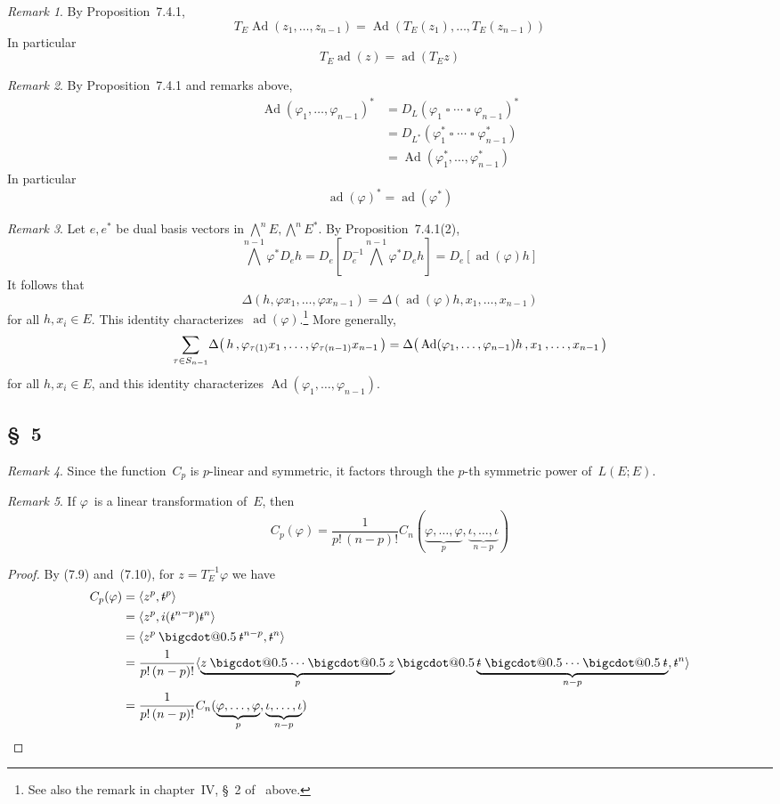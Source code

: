\documentclass[letterpaper,12pt]{article}
\makeatletter
\DeclareMathOperator{\ad}{ad}
\DeclareMathOperator{\Ad}{Ad}
\newcommand{\bigcdot}[1]{\mathbin{\mathpalette\bigcdot@{#1}}}
\newcommand{\bigcdot@}[2]{%
  \sbox0{$#1\vcenter{}$}%
  \sbox2{$#1\cdot\m@th$}%
  \hbox{%
    \hfil
    \raise\ht0\hbox{%
      \scalebox{#2}{%
        \lower\ht0\hbox{$#1\bullet\m@th$}%
      }%
    }%
    \hfil
  }%
}
\newcommand{\bigeprod}{\bigwedge}
\newcommand{\medeprod}{{\textstyle\bigeprod}}
\newcommand{\mprod}{\bigcdot{0.5}}
\newcommand{\bprod}{\mathbin{\square}}
\newcommand{\sprod}[2]{\langle#1,#2\rangle}
\newcommand{\multi}[4]{#2_{#3}#1\cdots#1#2_{#4}}
\newcommand{\mprods}[3]{\multi{\mprod}{#1}{#2}{#3}}
\newcommand{\bprods}[3]{\multi{\bprod}{#1}{#2}{#3}}
\newcommand{\stroked}[1]{\mathrlap{\text{\kern0.05em-}}#1}
\newcommand{\unit}{\stroked{t}}
\theoremstyle{definition}
\theoremstyle{remark}
\newtheorem*{rmk}{Remark}
\makeatother
\begin{document}
\begin{rmk}
By Proposition~7.4.1,
\[T_E\Ad(z_1,\ldots,z_{n-1})=\Ad(T_E(z_1),\ldots,T_E(z_{n-1}))\]
In particular
\[T_E\ad(z)=\ad(T_Ez)\]
\end{rmk}

\begin{rmk}
By Proposition~7.4.1 and remarks above,
\begin{align*}
\Ad(\varphi_1,\ldots,\varphi_{n-1})^*&=D_L(\bprods{\varphi}{1}{n-1})^*\\
	&=D_{L^*}(\bprods{\varphi^*}{1}{n-1})\\
	&=\Ad(\varphi_1^*,\ldots,\varphi_{n-1}^*)
\end{align*}
In particular
\[\ad(\varphi)^*=\ad(\varphi^*)\]
\end{rmk}

\begin{rmk}
Let \(e,e^*\) be dual basis vectors in \(\medeprod^n E,\medeprod^n E^*\). By Proposition~7.4.1(2),
\[\medeprod^{n-1}\varphi^*D_eh=D_e[D_e^{-1}\medeprod^{n-1}\varphi^*D_eh]=D_e[\ad(\varphi)h]\]
It follows that
\[\Delta(h,\varphi x_1,\ldots,\varphi x_{n-1})=\Delta(\ad(\varphi)h,x_1,\ldots,x_{n-1})\]
for all \(h,x_i\in E\). This identity characterizes~\(\ad(\varphi)\).\footnote{See also the remark in chapter~IV, \S~2 of~\cite{greub1} above.} More generally,
\[\sum_{\tau\in S_{n-1}}\!\Delta\bigl(\,h\,,\varphi_{\tau(1)}x_1\,,\ldots,\varphi_{\tau(n-1)}x_{n-1}\,\bigr)\\=\Delta\bigl(\,\Ad(\varphi_1,\ldots,\varphi_{n-1})h\,,x_1\,,\ldots,x_{n-1}\,\bigr)\]
for all \(h,x_i\in E\), and this identity characterizes \(\Ad(\varphi_1,\ldots,\varphi_{n-1})\).
\end{rmk}

\subsection*{\S~5}
\begin{rmk}
Since the function~\(C_p\) is \(p\)-linear and symmetric, it factors through the \(p\)-th symmetric power of~\(L(E;E)\).
\end{rmk}

\begin{rmk}
If \(\varphi\)~is a linear transformation of~\(E\), then
\[C_p(\varphi)=\frac{1}{p!\,(n-p)!}C_n(\underbrace{\varphi,\ldots,\varphi}_p,\underbrace{\iota,\ldots,\iota}_{n-p})\]
\end{rmk}
\begin{proof}
By (7.9) and~(7.10), for \(z=T_E^{-1}\varphi\) we have
\begin{align*}
C_p(\varphi)&=\sprod{z^p}{\unit^p}\\
	&=\sprod{z^p}{i(\unit^{n-p})\unit^n}\\
	&=\sprod{z^p\mprod\unit^{n-p}}{\unit^n}\\
	&=\frac{1}{p!\,(n-p)!}\sprod{\underbrace{\mprods{z}{}{}}_p\mprod\underbrace{\mprods{\unit}{}{}}_{n-p}}{\unit^n}\\
	&=\frac{1}{p!\,(n-p)!}C_n(\underbrace{\varphi,\ldots,\varphi}_p,\underbrace{\iota,\ldots,\iota}_{n-p})\qedhere
\end{align*}
\end{proof}
\end{document}
